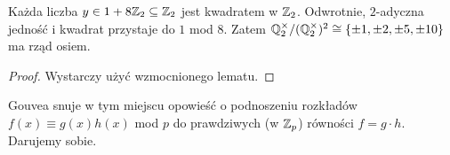 \begin{fakt}
	Każda  liczba $y \in 1 + 8\mathbb Z_2 \subseteq \mathbb Z_2$ jest kwadratem w $\mathbb Z_2$.
	Odwrotnie, $2$-adyczna jedność i kwadrat przystaje do $1$ mod $8$.
	Zatem $\mathbb Q^\times_2 / (\mathbb Q^\times_2)^2 \cong \{\pm 1, \pm 2, \pm 5, \pm 10\}$ ma rząd osiem.
\end{fakt}

\begin{proof}
	Wystarczy użyć wzmocnionego lematu.
\end{proof}

Gouvea snuje w tym miejscu opowieść o podnoszeniu rozkładów $f(x) \equiv g(x)h(x)$ mod $p$ do prawdziwych (w $\mathbb Z_p$) równości $f = g \cdot h$.
Darujemy sobie.